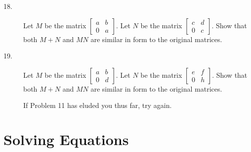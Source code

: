 \documentclass{article}
\begin{document}
\begin{description}
  \item[18.] Let $M$ be the matrix $\begin{bmatrix} a & b \\ 0 & a \end{bmatrix}$. Let $N$ be the matrix $\begin{bmatrix} c & d \\ 0 & c \end{bmatrix}$. Show that both $M+N$ and $MN$ are similar in form to the original matrices.

  \item[19.] Let $M$ be the matrix $\begin{bmatrix} a & b \\ 0 & d \end{bmatrix}$. Let $N$ be the matrix $\begin{bmatrix} e & f \\ 0 & h \end{bmatrix}$. Show that both $M+N$ and $MN$ are similar in form to the original matrices.

  \item[] If Problem 11 has eluded you thus far, try again.

\end{description}




\newpage

\section{Solving Equations}
\end{document}
